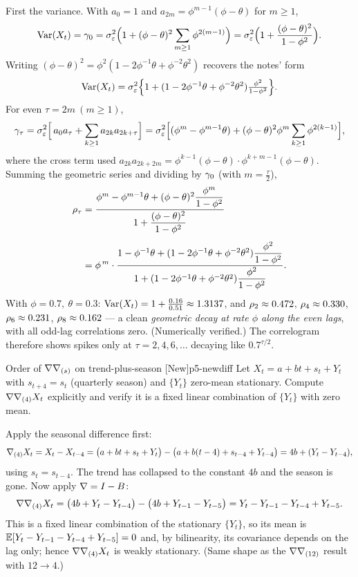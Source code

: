 \begin{solution}
First the variance. With $a_0=1$ and $a_{2m}=\phi^{m-1}(\phi-\theta)$ for
$m\ge1$,
\[
\operatorname{Var}(X_t)=\gamma_0=\sigma_\varepsilon^2\Bigl(1+(\phi-\theta)^{2}\sum_{m\ge1}\phi^{2(m-1)}\Bigr)
=\sigma_\varepsilon^2\Bigl(1+\frac{(\phi-\theta)^{2}}{1-\phi^{2}}\Bigr).
\]
Writing $(\phi-\theta)^{2}=\phi^{2}(1-2\phi^{-1}\theta+\phi^{-2}\theta^{2})$
recovers the notes' form
\[
\operatorname{Var}(X_t)=\sigma_\varepsilon^2\Bigl\{1+(1-2\phi^{-1}\theta+\phi^{-2}\theta^{2})\tfrac{\phi^{2}}{1-\phi^{2}}\Bigr\}.
\]
For even $\tau=2m\ (m\ge1)$,
\[
\gamma_\tau=\sigma_\varepsilon^2\Bigl[\,a_0 a_\tau+\sum_{k\ge1}a_{2k}a_{2k+\tau}\Bigr]
=\sigma_\varepsilon^2\Bigl[(\phi^{m}-\phi^{m-1}\theta)+(\phi-\theta)^{2}\phi^{m}\sum_{k\ge1}\phi^{2(k-1)}\Bigr],
\]
where the cross term used
$a_{2k}a_{2k+2m}=\phi^{k-1}(\phi-\theta)\cdot\phi^{k+m-1}(\phi-\theta)$.
Summing the geometric series and dividing by $\gamma_0$ (with $m=\tfrac\tau2$),
\[
\begin{aligned}
\rho_\tau
&=\frac{\phi^{m}-\phi^{m-1}\theta+(\phi-\theta)^{2}\dfrac{\phi^{m}}{1-\phi^{2}}}
{\,1+\dfrac{(\phi-\theta)^{2}}{1-\phi^{2}}\,}\\[4pt]
&=\phi^{\,m}\cdot
\frac{1-\phi^{-1}\theta+(1-2\phi^{-1}\theta+\phi^{-2}\theta^{2})\dfrac{\phi^{2}}{1-\phi^{2}}}
{\,1+(1-2\phi^{-1}\theta+\phi^{-2}\theta^{2})\dfrac{\phi^{2}}{1-\phi^{2}}\,}.
\end{aligned}
\]
With $\phi=0.7,\ \theta=0.3$: $\operatorname{Var}(X_t)=1+\tfrac{0.16}{0.51}\approx1.3137$, and
$\rho_2\approx0.472$, $\rho_4\approx0.330$, $\rho_6\approx0.231$,
$\rho_8\approx0.162$ --- a clean \emph{geometric decay at rate $\phi$ along the
even lags}, with all odd-lag correlations zero. (Numerically verified.) The
correlogram therefore shows spikes only at $\tau=2,4,6,\dots$ decaying like
$0.7^{\tau/2}$.
\end{solution}

\begin{exercise}{Order of $\nabla\nabla_{(s)}$ on trend-plus-season \quad\textnormal{[New]}}{p5-newdiff}
Let $X_t=a+bt+s_t+Y_t$ with $s_{t+4}=s_t$ (quarterly season) and $\{Y_t\}$
zero-mean stationary. Compute $\nabla\nabla_{(4)}X_t$ explicitly and verify it is a
fixed linear combination of $\{Y_t\}$ with zero mean.
\end{exercise}
\begin{solution}
Apply the seasonal difference first:
\[
\nabla_{(4)}X_t=X_t-X_{t-4}
=\bigl(a+bt+s_t+Y_t\bigr)-\bigl(a+b(t-4)+s_{t-4}+Y_{t-4}\bigr)
=4b+(Y_t-Y_{t-4}),
\]
using $s_t=s_{t-4}$. The trend has collapsed to the constant $4b$ and the season
is gone. Now apply $\nabla=I-B$:
\[
\nabla\nabla_{(4)}X_t=\bigl(4b+Y_t-Y_{t-4}\bigr)-\bigl(4b+Y_{t-1}-Y_{t-5}\bigr)
=Y_t-Y_{t-1}-Y_{t-4}+Y_{t-5}.
\]
This is a fixed linear combination of the stationary $\{Y_t\}$, so its mean is
$\mathbb{E}[Y_t-Y_{t-1}-Y_{t-4}+Y_{t-5}]=0$ and, by bilinearity, its covariance depends
on the lag only; hence $\nabla\nabla_{(4)}X_t$ is weakly stationary. (Same shape as
the $\nabla\nabla_{(12)}$ result with $12\to4$.)
\end{solution}

